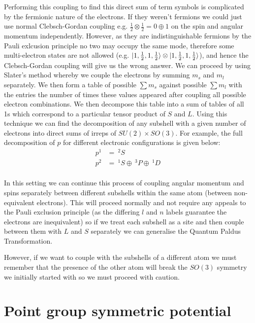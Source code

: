 \documentclass{article}
\begin{document}
Performing this coupling to find this direct sum of term symbols is complicated by the fermionic nature of the electrons. If they weren't fermions we could just use normal Clebsch-Gordan coupling e.g. $\frac{1}{2}\otimes \frac{1}{2} = 0 \oplus 1$ on the spin and angular momentum independently. However, as they are indistinguishable fermions by the Pauli exlcusion principle no two may occupy the same mode, therefore some multi-electron states are not allowed (e.g. $\ket{1,\frac{1}{2},1,\frac{1}{2}}\otimes \ket{1,\frac{1}{2},1,\frac{1}{2}}$), and hence the Clebsch-Gordan coupling will give us the wrong answer. We can proceed by using Slater's method whereby we couple the electrons by summing $m_s$ and $m_l$ separately. We then form a table of possible $\sum m_s$ against possible $\sum m_l$ with the entries the number of times these values appeared after coupling all possible electron combinations. We then decompose this table into a sum of tables of all 1s which correspond to a particular tensor product of $S$ and $L$. Using this technique we can find the decomposition of any subshell with a given number of electrons into direct sums of irreps of $SU(2)\times SO(3)$. For example, the full decomposition of $p$ for different electronic configurations is given below:
\begin{align}
    p^1 &= \>^2S\\
    p^2 &= \>^1S \oplus \>^3P \oplus \>^1D\\
\end{align}

In this setting we can continue this process of coupling angular momentum and spins separately between different subshells within the same atom (between non-equivalent electrons). This will proceed normally and not require any appeals to the Pauli exclusion principle (as the differing $l$ and $n$ labels guarantee the electrons are inequivalent) so if we treat each subshell as a site and then couple between them with $L$ and $S$ separately we can generalise the Quantum Paldus Transformation.

However, if we want to couple with the subshells of a different atom we must remember that the presence of the other atom will break the $SO(3)$ symmetry we initially started with so we must proceed with caution.

\section{Point group symmetric potential}
\end{document}
